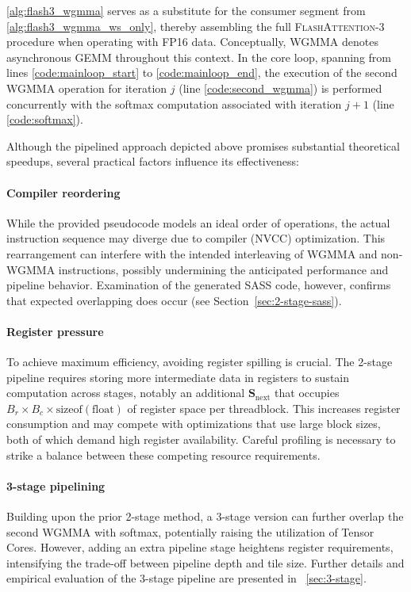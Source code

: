 \cref{alg:flash3_wgmma} serves as a substitute for the consumer segment from \cref{alg:flash3_wgmma_ws_only}, thereby assembling the full \textsc{FlashAttention-3} procedure when operating with FP16 data. Conceptually, WGMMA denotes asynchronous GEMM throughout this context. In the core loop, spanning from lines \ref{code:mainloop_start} to \ref{code:mainloop_end}, the execution of the second WGMMA operation for iteration $j$ (line \ref{code:second_wgmma}) is performed concurrently with the softmax computation associated with iteration $j+1$ (line \ref{code:softmax}).

Although the pipelined approach depicted above promises substantial theoretical speedups, several practical factors influence its effectiveness:

\paragraph{Compiler reordering} While the provided pseudocode models an ideal order of operations, the actual instruction sequence may diverge due to compiler (NVCC) optimization. This rearrangement can interfere with the intended interleaving of WGMMA and non-WGMMA instructions, possibly undermining the anticipated performance and pipeline behavior. Examination of the generated SASS code, however, confirms that expected overlapping does occur (see Section~\ref{sec:2-stage-sass}).

\paragraph{Register pressure} To achieve maximum efficiency, avoiding register spilling is crucial. The 2-stage pipeline requires storing more intermediate data in registers to sustain computation across stages, notably an additional $\mathbf{S}_{\mathrm{next}}$ that occupies $B_r \times B_c \times \text{sizeof}(\text{float})$ of register space per threadblock. This increases register consumption and may compete with optimizations that use large block sizes, both of which demand high register availability. Careful profiling is necessary to strike a balance between these competing resource requirements.

\paragraph{3-stage pipelining} Building upon the prior 2-stage method, a 3-stage version can further overlap the second WGMMA with softmax, potentially raising the utilization of Tensor Cores. However, adding an extra pipeline stage heightens register requirements, intensifying the trade-off between pipeline depth and tile size. Further details and empirical evaluation of the 3-stage pipeline are presented in ~\cref{sec:3-stage}.


